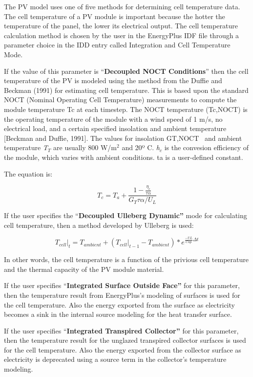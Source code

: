 The PV model uses one of five methods for determining cell temperature data. The cell temperature of a PV module is important because the hotter the temperature of the panel, the lower its electrical output. The cell temperature calculation method is chosen by the user in the EnergyPlus IDF file through a parameter choice in the IDD entry called Integration and Cell Temperature Mode.

If the value of this parameter is ``\textbf{Decoupled NOCT Conditions}'' then the cell temperature of the PV is modeled using the method from the Duffie and Beckman (1991) for estimating cell temperature. This is based upon the standard NOCT (Nominal Operating Cell Temperature) measurements to compute the module temperature Tc at each timestep. The NOCT temperature (Tc,NOCT) is the operating temperature of the module with a wind speed of 1 m/s, no electrical load, and a certain specified insolation and ambient temperature {[}Beckman and Duffie, 1991{]}. The values for insolation GT,NOCT ~and ambient temperature \emph{T\(_{T}\)} are usually 800 W/m\(^{2}\) and 20º C. \emph{h\(_{c}\)} is the convesion efficiency of the module, which varies with ambient conditions. ta is a user-defined constant.

The equation is:

\begin{equation}
  T_c = T_a + \frac{1-\frac{\eta_c}{\tau \alpha}}{G_T \tau\alpha/U_L}
\end{equation}

If the user specifies the ``\textbf{Decoupled Ulleberg Dynamic''} mode for calculating cell temperature, then a method developed by Ulleberg is used:

\begin{equation}
{\left. {{T_{cell}}} \right|_t} = {T_{ambient}} + \left( {{{\left. {{T_{cell}}} \right|}_{t - 1}} - {T_{ambient}}} \right)*{e^{\frac{{ - UL}}{{Cap}}\Delta t}}
\end{equation}

In other words, the cell temperature is a function of the privious cell temperature and the thermal capacity of the PV module material.

If the user specifies ``\textbf{Integrated Surface Outside Face''} for this parameter, then the temperature result from EnergyPlus's modeling of surfaces is used for the cell temperature. Also the energy exported from the surface as electricity becomes a sink in the internal source modeling for the heat transfer surface.

If the user specifies ``\textbf{Integrated Transpired Collector''} for this parameter, then the temperature result for the unglazed transpired collector surfaces is used for the cell temperature. Also the energy exported from the collector surface as electricity is deprecated using a source term in the collector's temperature modeling.

